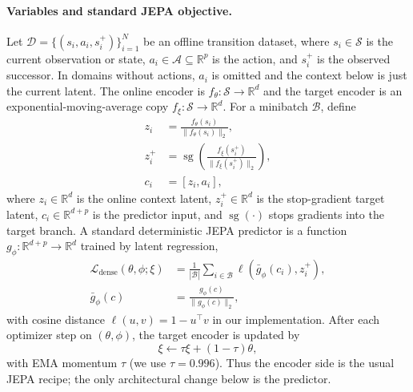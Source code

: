 \documentclass[letterpaper]{article}
\begin{document}
\paragraph{Variables and standard JEPA objective.}
Let $\mathcal{D}=\{(s_i,a_i,s_i^+)\}_{i=1}^N$ be an offline transition dataset, where
$s_i\in\mathcal{S}$ is the current observation or state, $a_i\in\mathcal{A}\subseteq\mathbb{R}^{p}$ is the
action, and $s_i^+$ is the observed successor. In domains without actions, $a_i$ is omitted and the context
below is just the current latent. The online encoder is $f_\theta:\mathcal{S}\to\mathbb{R}^d$ and the
target encoder is an exponential-moving-average copy $f_\xi:\mathcal{S}\to\mathbb{R}^d$. For a minibatch
$\mathcal{B}$, define
\begin{equation}
\begin{aligned}
z_i &= \frac{f_\theta(s_i)}{\lVert f_\theta(s_i)\rVert_2},\\
z_i^+ &= \operatorname{sg}\!\left(
\frac{f_\xi(s_i^+)}{\lVert f_\xi(s_i^+)\rVert_2}\right),\\
c_i &= [z_i,a_i],
\end{aligned}
\end{equation}
where $z_i\in\mathbb{R}^d$ is the online context latent, $z_i^+\in\mathbb{R}^d$ is the stop-gradient target
latent, $c_i\in\mathbb{R}^{d+p}$ is the predictor input, and $\operatorname{sg}(\cdot)$ stops gradients into
the target branch. A standard deterministic JEPA predictor is a function
$g_\phi:\mathbb{R}^{d+p}\to\mathbb{R}^d$ trained by latent regression,
\begin{equation}
\begin{aligned}
\mathcal{L}_{\mathrm{dense}}(\theta,\phi;\xi)
&= \frac{1}{|\mathcal{B}|}\sum_{i\in\mathcal{B}}
\ell\!\left(\bar g_\phi(c_i), z_i^+\right),\\
\bar g_\phi(c)&=\frac{g_\phi(c)}{\lVert g_\phi(c)\rVert_2},
\end{aligned}
\end{equation}
with cosine distance $\ell(u,v)=1-u^\top v$ in our implementation. After each optimizer step on
$(\theta,\phi)$, the target encoder is updated by
\begin{equation}
\xi \leftarrow \tau \xi + (1-\tau)\theta ,
\end{equation}
with EMA momentum $\tau$ (we use $\tau=0.996$). Thus the encoder side is the usual JEPA recipe; the only
architectural change below is the predictor.
\end{document}
